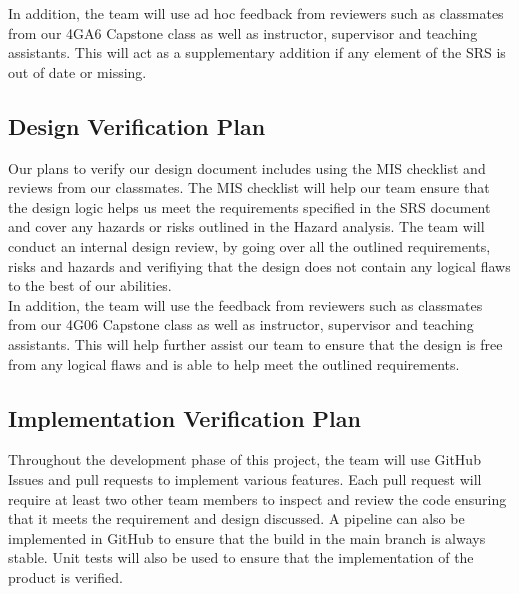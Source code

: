 \documentclass[12pt, titlepage]{article}
\begin{document}
\noindent  In addition, the team will use ad hoc feedback from reviewers such as classmates from our 4GA6 Capstone class as well
as instructor, supervisor and teaching assistants. This will act as a supplementary addition if any element of the SRS 
is out of date or missing.

\subsection{Design Verification Plan}

Our plans to verify our design document includes using the MIS checklist and reviews from our classmates. 
The MIS checklist will help our team ensure that the design logic helps us meet the requirements specified in 
the SRS document and cover any hazards or risks outlined in the Hazard analysis. The team will conduct an internal 
design review, by going over all the outlined requirements, risks and hazards and verifiying that the design does not
contain any logical flaws to the best of our abilities. \\

\noindent  In addition, the team will use the feedback from reviewers such as classmates from our 4G06 Capstone class as well
as instructor, supervisor and teaching assistants. This will help further assist our team to ensure that the design is free from 
any logical flaws and is able to help meet the outlined requirements. 




\subsection{Implementation Verification Plan}


Throughout the development phase of this project, the team will use GitHub Issues and pull requests to implement
various features. Each pull request will require at least two other team members to inspect and review the code 
ensuring that it meets the requirement and design discussed. A pipeline can also be implemented in GitHub to ensure that
the build in the main branch is always stable. Unit tests will also be used to ensure that the implementation of the product
is verified. 
\end{document}
